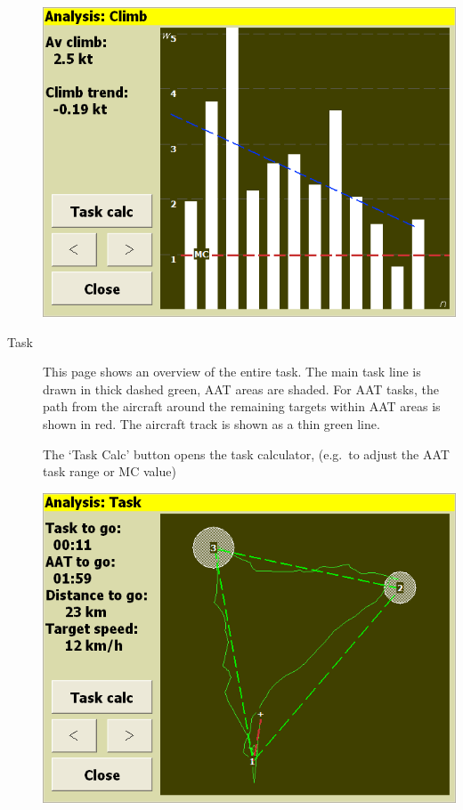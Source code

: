 \documentclass[a4paper,12pt]{refrep}
\begin{document}
\begin{description}
\begin{center}
\includegraphics[angle=0,width=\linewidth,keepaspectratio='true']{figures/analysis-climb.png}
\end{center}

\item[Task]
  This page shows an overview of the entire task.  The main task line
  is drawn in thick dashed green, AAT areas are shaded.  For AAT
  tasks, the path from the aircraft around the remaining targets within AAT
  areas is shown in red.  The aircraft track is shown as a thin green line.

  The `Task Calc' button opens the task calculator,
  (e.g.\ to adjust the AAT task range or MC value)

\begin{center}
\includegraphics[angle=0,width=\linewidth,keepaspectratio='true']{figures/analysis-task.png}
\end{center}

\end{description}
\end{document}
